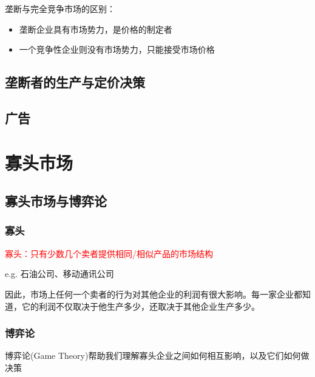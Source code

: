 \documentclass[12pt, a4paper]{article}
\begin{document}
垄断与完全竞争市场的区别：

\begin{itemize}
  \item 垄断企业具有市场势力，是价格的制定者
  \item 一个竞争性企业则没有市场势力，只能接受市场价格
\end{itemize}

\subsection{垄断者的生产与定价决策}




\subsection{广告}

\newpage
\section{寡头市场}

\subsection{寡头市场与博弈论}

\subsubsection{寡头}

\textcolor{red}{寡头：只有少数几个卖者提供相同/相似产品的市场结构}

e.g. 石油公司、移动通讯公司

因此，市场上任何一个卖者的行为对其他企业的利润有很大影响。每一家企业都知道，它的利润不仅取决于他生产多少，还取决于其他企业生产多少。

\subsubsection{博弈论}

博弈论(Game Theory)帮助我们理解寡头企业之间如何相互影响，以及它们如何做决策
\end{document}
